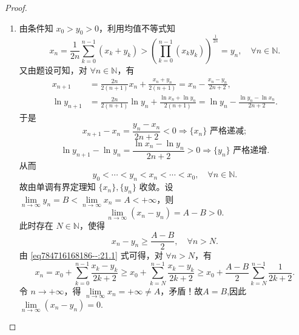 \documentclass[../../main.tex]{subfiles}%
\begin{document}
\begin{proof}
\begin{enumerate}[(1)]
\item 由条件知 $x_0 > y_0 > 0$，利用均值不等式知
\[
x_n = \frac{1}{2n}\sum_{k=0}^{n-1}(x_k + y_k) > \left( \prod_{k=0}^{n-1}(x_k y_k) \right)^{\frac{1}{2n}} = y_n,\quad \forall n \in \mathbb{N}.
\]
又由题设可知，对 $\forall n \in \mathbb{N}$，有
\begin{align}
x_{n+1} &= \frac{2n}{2(n+1)}x_n + \frac{x_n + y_n}{2(n+1)} = x_n - \frac{x_n - y_n}{2n+2}, \label{eq784716168186--:21.1} \\
\ln y_{n+1} &= \frac{2n}{2(n+1)}\ln y_n + \frac{\ln x_n + \ln y_n}{2(n+1)} = \ln y_n - \frac{\ln y_n - \ln x_n}{2n+2}. \label{eq784716168186--:21.2}
\end{align}
于是
\[
x_{n+1} - x_n = \frac{y_n - x_n}{2n+2} < 0 \Longrightarrow \{x_n\} \text{ 严格递减};
\]
\[
\ln y_{n+1} - \ln y_n = \frac{\ln x_n - \ln y_n}{2n+2} > 0 \Longrightarrow \{y_n\} \text{ 严格递增}.
\]
从而
\[
y_0 < \cdots < y_n < x_n < \cdots < x_0,\quad \forall n \in \mathbb{N}.
\]
故由单调有界定理知 $\{x_n\}, \{y_n\}$ 收敛。设 $\lim\limits_{n \to \infty} y_n = B < \lim\limits_{n \to \infty} x_n = A < +\infty$，则
\[
\lim\limits_{n \to \infty}(x_n - y_n) = A - B > 0.
\]
此时存在 $N \in \mathbb{N}$，使得
\[
x_n - y_n \geqslant \frac{A - B}{2},\quad \forall n > N.
\]
由 \eqref{eq784716168186--:21.1} 式可得，对 $\forall n > N$，有
\[
x_n = x_0 + \sum_{k=0}^{n-1} \frac{x_k - y_k}{2k+2} \geqslant x_0 + \sum_{k=N}^{n-1} \frac{x_k - y_k}{2k+2} \geqslant x_0 + \frac{A - B}{2}\sum_{k=N}^{n-1} \frac{1}{2k+2}.
\]
令 $n \to +\infty$，得 $\lim\limits_{n \to \infty} x_n = +\infty \ne A$，矛盾！故$A=B$,因此$\lim\limits_{n \to \infty} (x_n-y_n)=0.$


\end{enumerate}
\end{proof}
\end{document}
